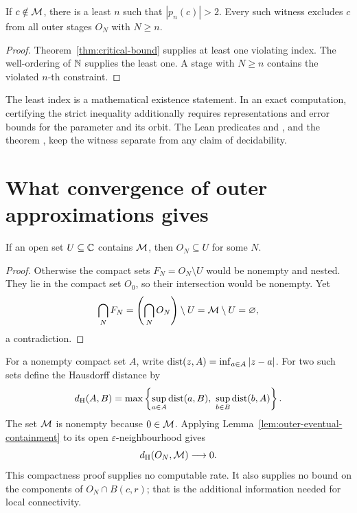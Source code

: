 \begin{proposition}
\label{prop:first-escape}
If $c\notin\mathcal M$, there is a least $n$ such that $|p_n(c)|>2$.
Every such witness excludes $c$ from all outer stages $O_N$ with $N\ge n$.
\end{proposition}

\begin{proof}
Theorem~\ref{thm:critical-bound} supplies at least one violating index.
The well-ordering of $\mathbb N$ supplies the least one.  A stage with $N\ge n$
contains the violated $n$-th constraint.
\end{proof}

The least index is a mathematical existence statement.  In an exact
computation, certifying the strict inequality additionally requires
representations and error bounds for the parameter and its orbit.
The Lean predicates  and , and the
theorem
,
keep the witness separate from any claim of decidability.

\section{What convergence of outer approximations gives}

\begin{lemma}
\label{lem:outer-eventual-containment}
If an open set $U\subseteq\mathbb C$ contains $\mathcal M$, then $O_N\subseteq U$ for
some $N$.
\end{lemma}

\begin{proof}
Otherwise the compact sets $F_N=O_N\setminus U$ would be nonempty and
nested.  They lie in the compact set $O_0$, so their intersection would
be nonempty.  Yet
\[
 \bigcap_N F_N=\left(\bigcap_N O_N\right)\setminus U
              =\mathcal M\setminus U=\varnothing,
\]
a contradiction.
\end{proof}

For a nonempty compact set $A$, write
$\operatorname{dist}(z,A)=\inf_{a\in A}|z-a|$.  For two such sets define the Hausdorff
distance by
\[
 d_{\mathrm H}(A,B)=
 \max\left\{\sup_{a\in A}\operatorname{dist}(a,B),\
             \sup_{b\in B}\operatorname{dist}(b,A)\right\}.
\]
The set $\mathcal M$ is nonempty because $0\in\mathcal M$.  Applying
Lemma~\ref{lem:outer-eventual-containment} to its open
$\varepsilon$-neighbourhood gives
\[
 d_{\mathrm H}(O_N,\mathcal M)\longrightarrow0.
\]
This compactness proof supplies no computable rate.  It also supplies
no bound on the components of $O_N\cap B(c,r)$; that is the additional
information needed for local connectivity.


